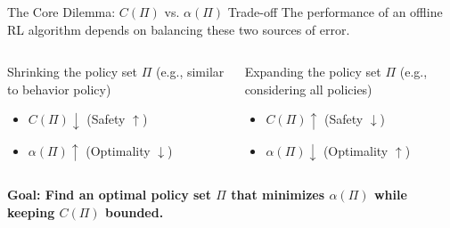 \documentclass[11pt]{beamer}
\newcommand{\tb}[1]{\textbf{#1}}
\begin{document}
\begin{frame}{The Core Dilemma: $C(\Pi)$ vs. $\alpha(\Pi)$ Trade-off}
    The performance of an offline RL algorithm depends on balancing these two sources of error.

    \begin{columns}[T]
        \begin{column}{.5\textwidth}
            \begin{block}{Shrinking the policy set $\Pi$}
                (e.g., similar to behavior policy)
                \begin{itemize}
                    \item $C(\Pi) \downarrow$ (Safety $\uparrow$)
                    \item $\alpha(\Pi) \uparrow$ (Optimality $\downarrow$)
                \end{itemize}
            \end{block}
        \end{column}
        \begin{column}{.5\textwidth}
            \begin{block}{Expanding the policy set $\Pi$}
                (e.g., considering all policies)
                \begin{itemize}
                    \item $C(\Pi) \uparrow$ (Safety $\downarrow$)
                    \item $\alpha(\Pi) \downarrow$ (Optimality $\uparrow$)
                \end{itemize}
            \end{block}
        \end{column}
    \end{columns}

    \vspace{1cm}
    \begin{center}
        \tb{Goal: Find an optimal policy set $\Pi$ that minimizes $\alpha(\Pi)$ while keeping $C(\Pi)$ bounded.}
    \end{center}
\end{frame}
\end{document}
